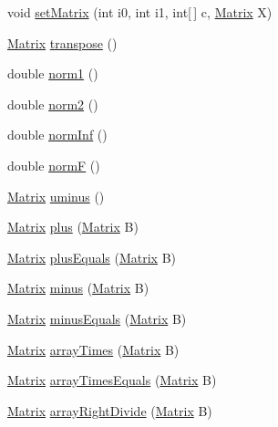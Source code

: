 \begin{DoxyCompactItemize}
void \hyperlink{class_jama_1_1_matrix_a0c326f12d09336f3b0d46c6e76cc6fc2}{set\+Matrix} (int i0, int i1, int\mbox{[}$\,$\mbox{]} c, \hyperlink{class_jama_1_1_matrix}{Matrix} X)
\item 
\hyperlink{class_jama_1_1_matrix}{Matrix} \hyperlink{class_jama_1_1_matrix_a9cb00b58a95db447b59656a8aa40445b}{transpose} ()
\item 
double \hyperlink{class_jama_1_1_matrix_a66c3b66a80b318b5b45daf00889001fb}{norm1} ()
\item 
double \hyperlink{class_jama_1_1_matrix_a2b1fe4347a446171f832698d5670732c}{norm2} ()
\item 
double \hyperlink{class_jama_1_1_matrix_a901c4b15be02dbe2439be8deb85f53f8}{norm\+Inf} ()
\item 
double \hyperlink{class_jama_1_1_matrix_a2a96d7ee038e91673c0b43c28304ba5f}{norm\+F} ()
\item 
\hyperlink{class_jama_1_1_matrix}{Matrix} \hyperlink{class_jama_1_1_matrix_aadd8693971d8e156636214277c9f6121}{uminus} ()
\item 
\hyperlink{class_jama_1_1_matrix}{Matrix} \hyperlink{class_jama_1_1_matrix_a2c5edccd172a912532566f7fc5b66361}{plus} (\hyperlink{class_jama_1_1_matrix}{Matrix} B)
\item 
\hyperlink{class_jama_1_1_matrix}{Matrix} \hyperlink{class_jama_1_1_matrix_a1bb76323469e35032c606346d579e0fb}{plus\+Equals} (\hyperlink{class_jama_1_1_matrix}{Matrix} B)
\item 
\hyperlink{class_jama_1_1_matrix}{Matrix} \hyperlink{class_jama_1_1_matrix_a73fe15c75990210496725df14d7c1aad}{minus} (\hyperlink{class_jama_1_1_matrix}{Matrix} B)
\item 
\hyperlink{class_jama_1_1_matrix}{Matrix} \hyperlink{class_jama_1_1_matrix_a665bb3ba66a0f8fc36b57cc9a3b86fe3}{minus\+Equals} (\hyperlink{class_jama_1_1_matrix}{Matrix} B)
\item 
\hyperlink{class_jama_1_1_matrix}{Matrix} \hyperlink{class_jama_1_1_matrix_a71306a047ceaa72f4aa1c69966228c63}{array\+Times} (\hyperlink{class_jama_1_1_matrix}{Matrix} B)
\item 
\hyperlink{class_jama_1_1_matrix}{Matrix} \hyperlink{class_jama_1_1_matrix_afaba8a18f411bdb8fdcd2bd4bc30d751}{array\+Times\+Equals} (\hyperlink{class_jama_1_1_matrix}{Matrix} B)
\item 
\hyperlink{class_jama_1_1_matrix}{Matrix} \hyperlink{class_jama_1_1_matrix_ad87a79fe541e91a0d42b0dd6fb870d05}{array\+Right\+Divide} (\hyperlink{class_jama_1_1_matrix}{Matrix} B)
\item 

\end{DoxyCompactItemize}
